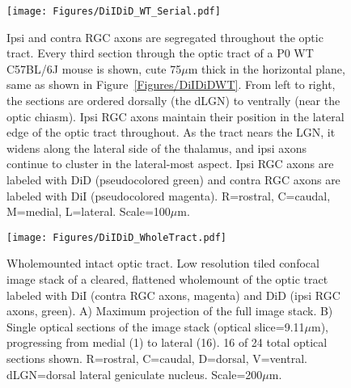 \begin{figure}[hbtp]
    \begin{center}
        \texttt{[image: Figures/DiIDiD\_WT\_Serial.pdf]}
        \caption[Ipsi and contra RGC axons are segregated throughout the optic tract.]
        {Ipsi and contra RGC axons are segregated throughout the optic tract.
        Every third section through the optic tract of a P0 WT C57BL/6J mouse is shown, cute 75$\mu$m thick in the horizontal plane, same as shown in Figure~\ref{Figures/DiIDiDWT}.
		From left to right, the sections are ordered dorsally (the dLGN) to ventrally (near the optic chiasm).
		Ipsi RGC axons maintain their position in the lateral edge of the optic tract throughout.
        As the tract nears the LGN, it widens along the lateral side of the thalamus, and ipsi axons continue to cluster in the lateral-most aspect.
        Ipsi RGC axons are labeled with DiD (pseudocolored green) and contra RGC axons are labeled with DiI (pseudocolored magenta).
        R=rostral, C=caudal, M=medial, L=lateral.
        Scale=100$\mu$m.}
        \label{Figures/DiIDiDWTSerial}
    \end{center}
\end{figure}
\begin{figure}[hbtp]
    \begin{center}
        \texttt{[image: Figures/DiIDiD\_WholeTract.pdf]}
        \caption[Wholemounted intact optic tract.]
        {Wholemounted intact optic tract.
        Low resolution tiled confocal image stack of a cleared, flattened wholemount of the optic tract labeled with DiI (contra RGC axons, magenta) and DiD (ipsi RGC axons, green).
        A) Maximum projection of the full image stack.
        B) Single optical sections of the image stack (optical slice=9.11$\mu$m), progressing from medial (1) to lateral (16).
        16 of 24 total optical sections shown.
        R=rostral, C=caudal, D=dorsal, V=ventral.
        dLGN=dorsal lateral geniculate nucleus.
        Scale=200$\mu$m.
        }
        \label{Figures/DiIDiDWholeTract}
    \end{center}
\end{figure}

